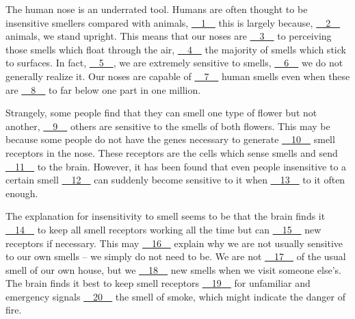 The human nose is an underrated tool. Humans are often thought to be insensitive  smellers  compared  with  animals, \uline{~~1~~} this  is  largely because, \uline{~~2~~} animals, we stand upright. This means that our noses are \uline{~~3~~} to perceiving those smells which float through the air, \uline{~~4~~} the majority of smells which stick to surfaces. In fact, \uline{~~5~~}, we are extremely sensitive to smells, \uline{~~6~~} we do not generally realize it. Our noses are capable of \uline{~~7~~} human smells even when these are \uline{~~8~~} to far below one part in one million.


Strangely, some people find that they can smell one type of flower but not another, \uline{~~9~~} others are sensitive to the smells of both flowers. This may be  because some people do not have the genes necessary to generate \uline{~~10~~} smell receptors in the nose. These receptors are the cells which sense smells and send \uline{~~11~~} to the brain. However, it has been found that even people insensitive to a certain smell \uline{~~12~~} can suddenly become sensitive to it when \uline{~~13~~} to it often enough.


The explanation for insensitivity to smell seems to be that the brain finds  it \uline{~~14~~} to keep all smell receptors working all the time but can \uline{~~15~~} new receptors if necessary. This may \uline{~~16~~} explain why we are not usually sensitive to our own smells – we simply do not need to be. We are not \uline{~~17~~} of the usual smell of our own house, but we \uline{~~18~~} new smells when we visit someone else's. The brain finds it  best to keep smell receptors \uline{~~19~~} for unfamiliar and emergency signals \uline{~~20~~} the smell of smoke, which might indicate the danger of fire.